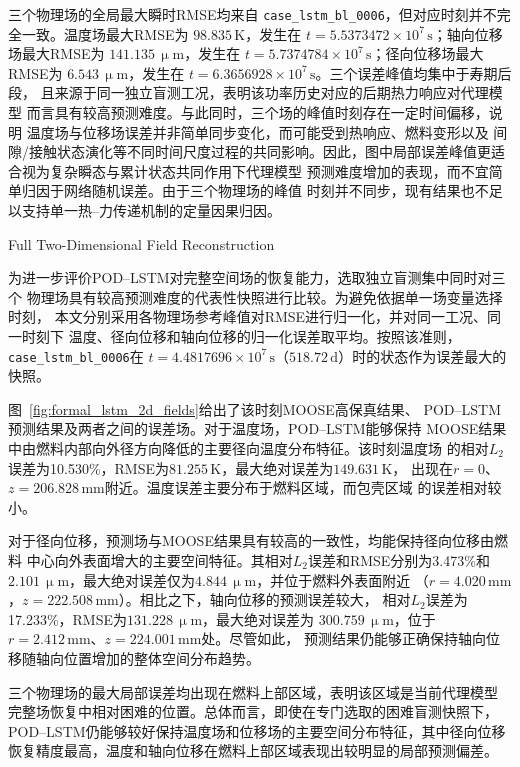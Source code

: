 三个物理场的全局最大瞬时RMSE均来自
\texttt{case\_lstm\_bl\_0006}，但对应时刻并不完全一致。温度场最大RMSE为
$98.835\,\mathrm{K}$，发生在
$t=5.5373472\times10^{7}\,\mathrm{s}$；轴向位移场最大RMSE为
$141.135\,\upmu\mathrm{m}$，发生在
$t=5.7374784\times10^{7}\,\mathrm{s}$；径向位移场最大RMSE为
$6.543\,\upmu\mathrm{m}$，发生在
$t=6.3656928\times10^{7}\,\mathrm{s}$。三个误差峰值均集中于寿期后段，
且来源于同一独立盲测工况，表明该功率历史对应的后期热力响应对代理模型
而言具有较高预测难度。与此同时，三个场的峰值时刻存在一定时间偏移，说明
温度场与位移场误差并非简单同步变化，而可能受到热响应、燃料变形以及
间隙/接触状态演化等不同时间尺度过程的共同影响。因此，图中局部误差峰值更适合视为复杂瞬态与累计状态共同作用下代理模型
预测难度增加的表现，而不宜简单归因于网络随机误差。由于三个物理场的峰值
时刻并不同步，现有结果也不足以支持单一热--力传递机制的定量因果归因。


{Full Two-Dimensional Field Reconstruction}

为进一步评价POD--LSTM对完整空间场的恢复能力，选取独立盲测集中同时对三个
物理场具有较高预测难度的代表性快照进行比较。为避免依据单一场变量选择时刻，
本文分别采用各物理场参考峰值对RMSE进行归一化，并对同一工况、同一时刻下
温度、径向位移和轴向位移的归一化误差取平均。按照该准则，
\texttt{case\_lstm\_bl\_0006}在
$t=4.4817696\times10^7\,\mathrm{s}$（$518.72\,\mathrm{d}$）时的状态作为误差最大的快照。

图~\ref{fig:formal_lstm_2d_fields}给出了该时刻MOOSE高保真结果、
POD--LSTM预测结果及两者之间的误差场。对于温度场，POD--LSTM能够保持
MOOSE结果中由燃料内部向外径方向降低的主要径向温度分布特征。该时刻温度场
的相对$L_2$误差为10.530\%，RMSE为$81.255\,\mathrm{K}$，最大绝对误差为$149.631\,\mathrm{K}$，
出现在$r=0$、$z=206.828\,\mathrm{mm}$附近。温度误差主要分布于燃料区域，而包壳区域
的误差相对较小。

对于径向位移，预测场与MOOSE结果具有较高的一致性，均能保持径向位移由燃料
中心向外表面增大的主要空间特征。其相对$L_2$误差和RMSE分别为3.473\%和
$2.101\,\upmu\mathrm{m}$，最大绝对误差仅为$4.844\,\upmu\mathrm{m}$，并位于燃料外表面附近
（$r=4.020\,\mathrm{mm}$，$z=222.508\,\mathrm{mm}$）。相比之下，轴向位移的预测误差较大，
相对$L_2$误差为17.233\%，RMSE为$131.228\,\upmu\mathrm{m}$，最大绝对误差为
$300.759\,\upmu\mathrm{m}$，位于$r=2.412\,\mathrm{mm}$、$z=224.001\,\mathrm{mm}$处。尽管如此，
预测结果仍能够正确保持轴向位移随轴向位置增加的整体空间分布趋势。

三个物理场的最大局部误差均出现在燃料上部区域，表明该区域是当前代理模型
完整场恢复中相对困难的位置。总体而言，即使在专门选取的困难盲测快照下，
POD--LSTM仍能够较好保持温度场和位移场的主要空间分布特征，其中径向位移
恢复精度最高，温度和轴向位移在燃料上部区域表现出较明显的局部预测偏差。

